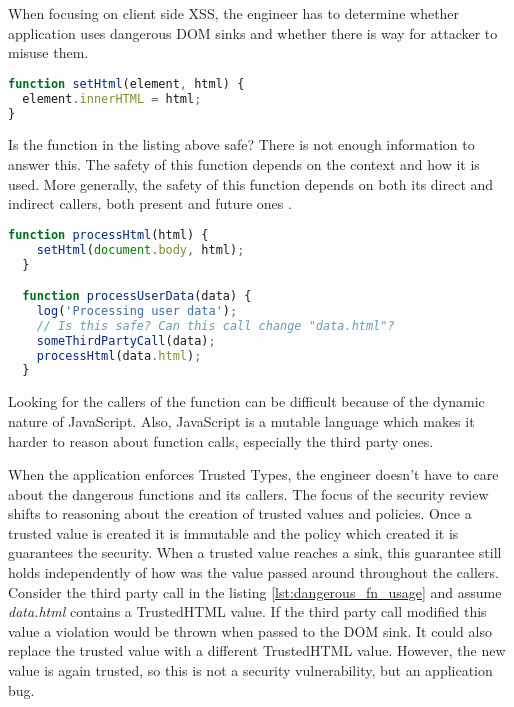 When focusing on client side XSS, the engineer has to determine whether application uses dangerous
DOM sinks and whether there is way for attacker to misuse them.

\bigskip
\begin{lstlisting}[language=JavaScript, caption=Possibly dangerous function]
function setHtml(element, html) {
  element.innerHTML = html;
}
\end{lstlisting}

Is the function in the listing above safe? There is not enough information to answer this. The
safety of this function depends on the context and how it is used. More generally, the safety of
this function depends on both its direct and indirect callers, both present and future ones
\cite{tt_design_history}.

\bigskip
\begin{lstlisting}[language=JavaScript, caption=Usage of the possibly dangerous function, label={lst:dangerous_fn_usage}]
  function processHtml(html) {
    setHtml(document.body, html);
  }

  function processUserData(data) {
    log('Processing user data');
    // Is this safe? Can this call change "data.html"?
    someThirdPartyCall(data);
    processHtml(data.html);
  }
\end{lstlisting}

Looking for the callers of the function can be difficult because of the dynamic nature of
JavaScript. Also, JavaScript is a mutable language which makes it harder to reason about function
calls, especially the third party ones.

When the application enforces Trusted Types, the engineer doesn't have to care about the dangerous
functions and its callers. The focus of the security review shifts to reasoning about the creation
of trusted values and policies. Once a trusted value is created it is immutable and the policy which
created it is guarantees the security. When a trusted value reaches a sink, this guarantee still
holds independently of how was the value passed around throughout the callers. Consider the third
party call in the listing \ref{lst:dangerous_fn_usage} and assume \textit{data.html} contains a
TrustedHTML value. If the third party call modified this value a violation would be thrown when
passed to the DOM sink. It could also replace the trusted value with a different TrustedHTML value.
However, the new value is again trusted, so this is not a security vulnerability, but an application
bug.

